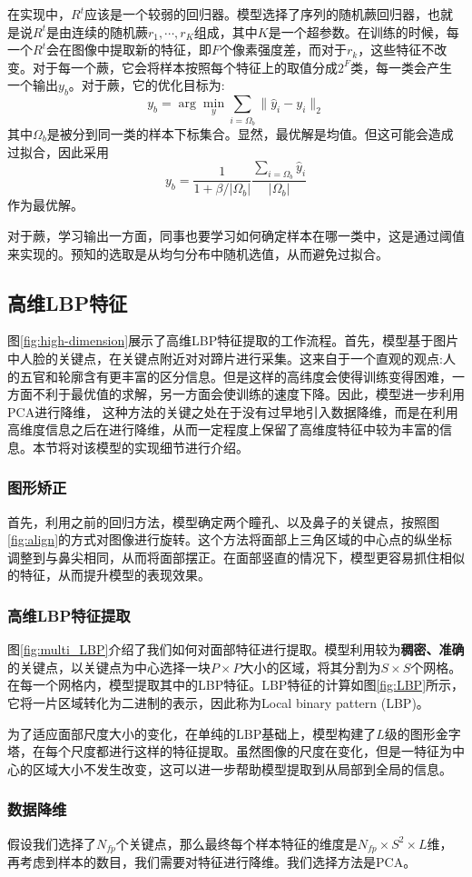 在实现中，$R^t$应该是一个较弱的回归器。模型选择了序列的随机蕨\cite{}回归器，也就是说$R^t$是由连续的随机蕨$r_1, \cdots, r_K$组成，其中$K$是一个超参数。在训练的时候，每一个$R^t$会在图像中提取新的特征，即$F$个像素强度差，而对于$r_k$，这些特征不改变。对于每一个蕨，它会将样本按照每个特征上的取值分成$2^F$类，每一类会产生一个输出$y_b$。对于蕨，它的优化目标为:
\[
y_b = \arg\min_{y} \sum_{i = \Omega_b} \|\hat{y}_i - y_i\|_2
\]
其中$\Omega_b$是被分到同一类的样本下标集合。显然，最优解是均值。但这可能会造成过拟合，因此采用
\[
y_b = \frac{1}{1 + \beta / |\Omega_b|} \frac{\sum_{i = \Omega_b}\hat{y}_i}{|\Omega_b|}
\]
作为最优解。

对于蕨，学习输出一方面，同事也要学习如何确定样本在哪一类中，这是通过阈值来实现的。预知的选取是从均匀分布中随机选值，从而避免过拟合。

\subsection{高维LBP特征}

图\ref{fig:high-dimension}展示了高维LBP特征提取的工作流程。首先，模型基于图片中人脸的关键点，在关键点附近对对蹄片进行采集。这来自于一个直观的观点:人的五官和轮廓含有更丰富的区分信息。但是这样的高纬度会使得训练变得困难，一方面不利于最优值的求解，另一方面会使训练的速度下降。因此，模型进一步利用PCA进行降维，
这种方法的关键之处在于没有过早地引入数据降维，而是在利用高维度信息之后在进行降维，从而一定程度上保留了高维度特征中较为丰富的信息。本节将对该模型的实现细节进行介绍。

\subsubsection{图形矫正}

首先，利用之前的回归方法，模型确定两个瞳孔、以及鼻子的关键点，按照图\ref{fig:align}的方式对图像进行旋转。这个方法将面部上三角区域的中心点的纵坐标调整到与鼻尖相同，从而将面部摆正。在面部竖直的情况下，模型更容易抓住相似的特征，从而提升模型的表现效果。

\subsubsection{高维LBP特征提取}

图\ref{fig:multi_LBP}介绍了我们如何对面部特征进行提取。模型利用较为\textbf{稠密、准确}的关键点，以关键点为中心选择一块$P\times P$大小的区域，将其分割为$S\times S$个网格。在每一个网格内，模型提取其中的LBP特征。LBP特征的计算如图\ref{fig:LBP}所示，它将一片区域转化为二进制的表示，因此称为Local binary pattern (LBP)。

为了适应面部尺度大小的变化，在单纯的LBP基础上，模型构建了$L$级的图形金字塔，在每个尺度都进行这样的特征提取。虽然图像的尺度在变化，但是一特征为中心的区域大小不发生改变，这可以进一步帮助模型提取到从局部到全局的信息。

\subsubsection{数据降维}

假设我们选择了$N_{fp}$个关键点，那么最终每个样本特征的维度是$N_{fp} \times S^2 \times L$维，再考虑到样本的数目，我们需要对特征进行降维。我们选择方法是PCA。